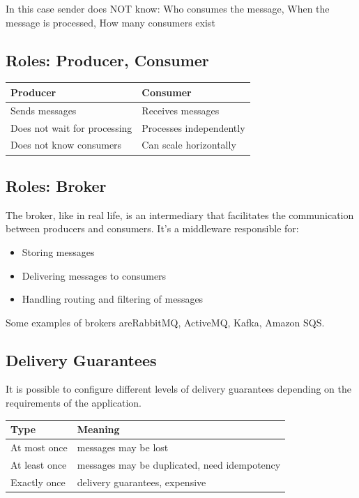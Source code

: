 In this case sender does NOT know:  Who consumes the message, When the message is processed, How many consumers exist

\subsection{Roles: Producer, Consumer}

\begin{table}[h!]
  \renewcommand{\arraystretch}{1.4}
  \centering
  \begin{tabular}{ll}
    \hline
    \textbf{Producer}            & \textbf{Consumer}       \\
    \hline
    Sends messages               & Receives messages       \\
    Does not wait for processing & Processes independently \\
    Does not know consumers      & Can scale horizontally  \\
    \hline
  \end{tabular}
\end{table}


\subsection{Roles: Broker}

The broker, like in real life, is an intermediary that facilitates the communication between producers and consumers.
It's a middleware responsible for:

\begin{itemize}
  \item Storing messages
  \item Delivering messages to consumers
  \item Handling routing and filtering of messages
\end{itemize}

Some examples of brokers areRabbitMQ, ActiveMQ, Kafka, Amazon SQS.



\subsection{Delivery Guarantees}
It is possible to configure different levels of delivery guarantees depending on the requirements of the application.

\begin{table}[h!]
  \renewcommand{\arraystretch}{1.4}
  \centering
  \begin{tabular}{l l}
    \hline
    \textbf{Type} & \textbf{Meaning}                             \\
    \hline
    At most once  & messages may be lost                         \\
    At least once & messages may be duplicated, need idempotency \\
    Exactly once  & delivery guarantees, expensive               \\
    \hline
  \end{tabular}
\end{table}


